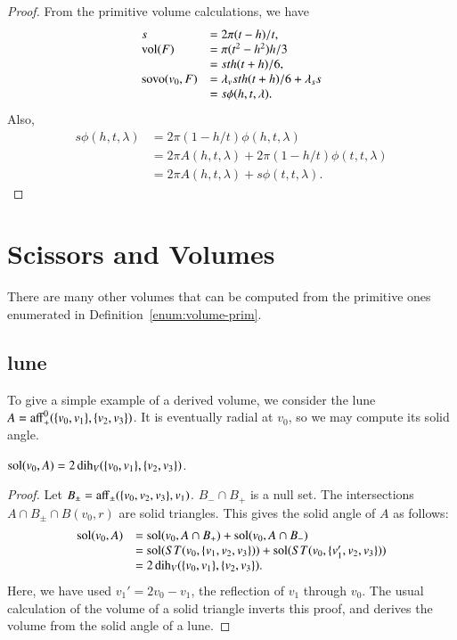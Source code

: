 \begin{proof}    From the primitive volume calculations,
we have 
  $$
  \begin{array}{lll}
  s &= 2\pi(t-h)/t,\\
  {\operatorname{vol}}(F) &= \pi(t^2-h^2)h/3\\
      &= s t h (t+h)/6,\\
  {\operatorname{sovo}}(v_0,F) &= 
     \lambda_v s t h (t+h)/6 + \lambda_s s\\
   &= s \phi(h,t,\lambda).
  \end{array}
  $$
Also,
  $$
  \begin{array}{lll}
  s\phi(h,t,\lambda) &= 2\pi (1-h/t)\phi(h,t,\lambda)\\
  &= 2\pi A(h,t,\lambda) + 2\pi (1-h/t)\phi(t,t,\lambda)\\
  &= 2\pi A(h,t,\lambda) + s \phi(t,t,\lambda).
  \end{array}
  $$
\end{proof}

\section{Scissors and Volumes}

There are many other volumes that can be computed from the
primitive ones enumerated in Definition~\ref{enum:volume-prim}.

\subsection{lune}  

To give a simple example of a derived volume, we consider the
lune $A={\operatorname{aff}}_+^0(\{v_0,v_1\},\{v_2,v_3\})$.  It is eventually
radial at $v_0$, so we may compute its solid angle.

\begin{lemma}  $\operatorname{sol}(v_0,A) = 2\operatorname{dih}_V(\{v_0,v_1\},\{v_2,v_3\})$.
\end{lemma}

\begin{proof}
Let $B_{\pm} = {\operatorname{aff}}_\pm(\{v_0,v_2,v_3\},v_1)$.  $B_- \cap B_+$
is a null set.  The intersections $A\cap B_{\pm}\cap B(v_0,r)$ 
are solid triangles.  This gives the solid angle of $A$ as
follows:
   $$\begin{array}{lll}
   \operatorname{sol}(v_0,A) &= \operatorname{sol}(v_0,A\cap B_+)+\operatorname{sol}(v_0,A\cap B_-) \\
   &= 
   \operatorname{sol}(ST(v_0,\{v_1,v_2,v_3\})) + \operatorname{sol}(ST(v_0,\{v_1',v_2,v_3\})) \\
   &=
   2\operatorname{dih}_V(\{v_0,v_1\},\{v_2,v_3\}).
   \end{array}
   $$
Here, we have used $v_1'= 2 v_0 - v_1$, the reflection of $v_1$
through $v_0$.  The usual calculation of the volume of a solid triangle
inverts this proof, 
and derives the volume from the solid angle of a lune.
\end{proof}



